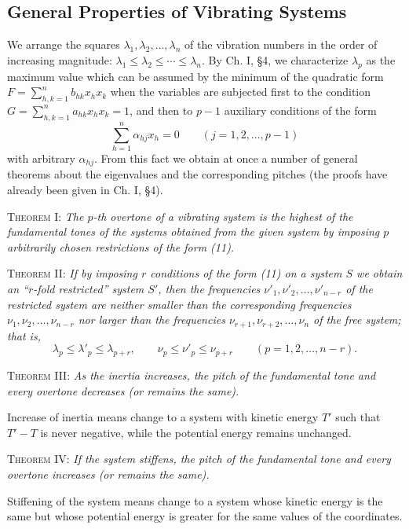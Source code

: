 \subsection{General Properties of Vibrating Systems}
We arrange the squares $\lambda_1,\lambda_2,\ldots,\lambda_n$ of the vibration numbers in the order of increasing magnitude: $\lambda_1\le\lambda_2\le\cdots\le\lambda_n$. By Ch. I, \S4, we characterize $\lambda_p$ as the maximum value which can be assumed by the minimum of the quadratic form $F=\sum_{h,k=1}^n b_{hk}x_hx_k$ when the variables are subjected first to the condition $G=\sum_{h,k=1}^n a_{hk}x_hx_k=1$, and then to $p-1$ auxiliary conditions of the form
\begin{equation}\tag{11}
\sum_{h=1}^n\alpha_{hj}x_h=0\qquad(j=1,2,\ldots,p-1)
\end{equation}
with arbitrary $\alpha_{hj}$. From this fact we obtain at once a number of general theorems about the eigenvalues and the corresponding pitches (the proofs have already been given in Ch. I, \S4).

\textsc{Theorem I:} \emph{The $p$-th overtone of a vibrating system is the highest of the fundamental tones of the systems obtained from the given system by imposing $p$ arbitrarily chosen restrictions of the form (11).}

\textsc{Theorem II:} \emph{If by imposing $r$ conditions of the form (11) on a system $S$ we obtain an ``$r$-fold restricted'' system $S'$, then the frequencies $\nu'_1,\nu'_2,\ldots,\nu'_{n-r}$ of the restricted system are neither smaller than the corresponding frequencies $\nu_1,\nu_2,\ldots,\nu_{n-r}$ nor larger than the frequencies $\nu_{r+1},\nu_{r+2},\ldots,\nu_n$ of the free system; that is,}
\[
\lambda_p\le\lambda'_p\le\lambda_{p+r},
\qquad
\nu_p\le\nu'_p\le\nu_{p+r}
\qquad(p=1,2,\ldots,n-r).
\]

\textsc{Theorem III:} \emph{As the inertia increases, the pitch of the fundamental tone and every overtone decreases (or remains the same).}

Increase of inertia means change to a system with kinetic energy $T'$ such that $T'-T$ is never negative, while the potential energy remains unchanged.

\textsc{Theorem IV:} \emph{If the system stiffens, the pitch of the fundamental tone and every overtone increases (or remains the same).}

Stiffening of the system means change to a system whose kinetic energy is the same but whose potential energy is greater for the same values of the coordinates.

